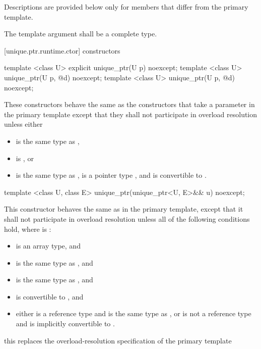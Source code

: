 \pnum
Descriptions are provided below only for members that
differ from the primary template.

\pnum
The template argument  shall be a complete type.

[unique.ptr.runtime.ctor]{ constructors}

%
\begin{itemdecl}
template <class U> explicit unique_ptr(U p) noexcept;
template <class U> unique_ptr(U p, @\seebelow@ d) noexcept;
template <class U> unique_ptr(U p, @\seebelow@ d) noexcept;
\end{itemdecl}

\begin{itemdescr}
\pnum
These constructors behave the same as
the constructors that take a  parameter
in the primary template
except that they
shall not participate in overload resolution unless either

\begin{itemize}
\item {} is the same type as ,
\item {} is , or
\item {} is the same type as ,
       is a pointer type , and
       is convertible to .
\end{itemize}
\end{itemdescr}

%
\begin{itemdecl}
template <class U, class E>
  unique_ptr(unique_ptr<U, E>&& u) noexcept;
\end{itemdecl}

\begin{itemdescr}
\pnum
This constructor behaves the same as in the primary template,
except that it shall not participate in overload resolution
unless all of the following conditions hold,
where  is :

\begin{itemize}
\item {} is an array type, and
\item {} is the same type as , and
\item {} is the same type as , and
\item {} is convertible to , and
\item either  is a reference type and  is the same type as ,
      or  is not a reference type and  is implicitly convertible to .
\end{itemize}

\enternote
this replaces the overload-resolution specification of the primary template
\exitnote
\end{itemdescr}

